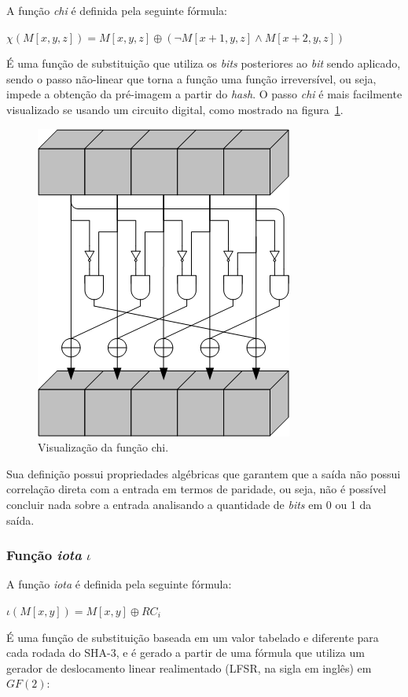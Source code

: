 A função \textit{chi} é definida pela seguinte fórmula:

$\chi(M[x, y, z]) = M[x, y, z] \oplus (\neg{M}[x+1, y, z] \land M[x+2, y, z])$

É uma função de substituição que utiliza os \textit{bits} posteriores ao
\textit{bit} sendo aplicado, sendo o passo não-linear que torna a função
\Keccak{} uma função irreversível, ou seja, impede a obtenção da pré-imagem a
partir do \textit{hash}. O passo \textit{chi} é mais facilmente visualizado se
usando um circuito digital, como mostrado na figura~\ref{fig:chi}.

\begin{figure}[ht]
    \centering
    \includegraphics{images/chi.png}
    \caption{Visualização da função chi.}
    \label{fig:chi}
\end{figure}

Sua definição possui propriedades algébricas que garantem que a saída não
possui correlação direta com a entrada em termos de paridade, ou seja, não é
possível concluir nada sobre a entrada analisando a quantidade de \textit{bits}
em 0 ou 1 da saída.

\subsubsection{Função \textit{iota} $\iota$}

A função \textit{iota} é definida pela seguinte fórmula:

$\iota(M[x, y]) = M[x, y] \oplus RC_{i}$

É uma função de substituição baseada em um valor tabelado e diferente para cada
rodada do SHA-3, e é gerado a partir de uma fórmula que utiliza um gerador de
deslocamento linear realimentado (LFSR, na sigla em inglês) em $GF(2)$:

